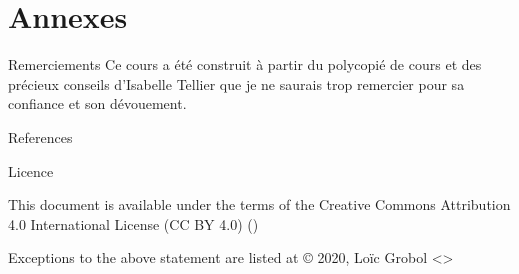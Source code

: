 \documentclass[xcolor={svgnames}, french]{beamer}
\begin{document}

\appendix
{}  %
\section{Annexes}
\begin{frame}{Remerciements}
    Ce cours a été construit à partir du polycopié de cours  \parencite{tellier2017IntroductionFouilleTextes} et des précieux conseils d'Isabelle Tellier que je ne saurais trop remercier pour sa confiance et son dévouement.
\end{frame}

\begin{frame}[allowframebreaks]{References}
    \printbibliography[heading=none]
\end{frame}

\begin{frame}{Licence}
    \begin{center}
        {\huge \ccby}
        \vfill
        This document is available under the terms of the Creative Commons Attribution 4.0 International License (CC BY 4.0) ()

        Exceptions to the above statement are listed at {\small{}}
        \vfill
        © 2020, Loïc Grobol <>

    \end{center}
\end{frame}
\end{document}
